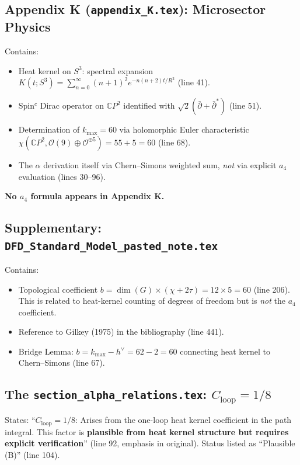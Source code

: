 \documentclass[11pt,a4paper]{article}
\begin{document}
\subsection{Appendix K (\texttt{appendix\_K.tex}): Microsector Physics}

Contains:
\begin{itemize}
\item Heat kernel on $S^3$: spectral expansion
$K(t; S^3) = \sum_{n=0}^{\infty}(n+1)^2 e^{-n(n+2)t/R^2}$ (line 41).
\item Spin$^c$ Dirac operator on $\mathbb{C}P^2$ identified with
$\sqrt{2}(\bar\partial + \bar\partial^*)$ (line 51).
\item Determination of $k_{\max} = 60$ via holomorphic Euler characteristic
$\chi(\mathbb{C}P^2, \mathcal{O}(9) \oplus \mathcal{O}^{\oplus 5}) = 55 + 5 = 60$
(line 68).
\item The $\alpha$ derivation itself via Chern--Simons weighted sum, \emph{not}
via explicit $a_4$ evaluation (lines 30--96).
\end{itemize}

\textbf{No $a_4$ formula appears in Appendix K.}

\subsection{Supplementary: \texttt{DFD\_Standard\_Model\_pasted\_note.tex}}

Contains:
\begin{itemize}
\item Topological coefficient $b = \dim(G) \times (\chi + 2\tau) = 12 \times 5 = 60$
(line 206).  This is related to heat-kernel counting of degrees of freedom but
is \emph{not} the $a_4$ coefficient.
\item Reference to Gilkey (1975) in the bibliography (line 441).
\item Bridge Lemma: $b = k_{\max} - h^{\vee} = 62 - 2 = 60$ connecting heat
kernel to Chern--Simons (line 67).
\end{itemize}

\subsection{The \texttt{section\_alpha\_relations.tex}: $C_{\mathrm{loop}} = 1/8$}

States: ``$C_{\mathrm{loop}} = 1/8$: Arises from the one-loop heat kernel
coefficient in the path integral.  This factor is \textbf{plausible from heat
kernel structure but requires explicit verification}'' (line 92, emphasis in
original).  Status listed as ``Plausible (B)'' (line 104).
\end{document}
